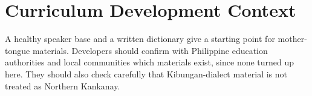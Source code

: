 \documentclass[12pt]{article}
\begin{document}
\section{Curriculum Development Context}
A healthy speaker base and a written dictionary give a starting point for mother-tongue materials. Developers should confirm with Philippine education authorities and local communities which materials exist, since none turned up here. They should also check carefully that Kibungan-dialect material is not treated as Northern Kankanay.
\end{document}
